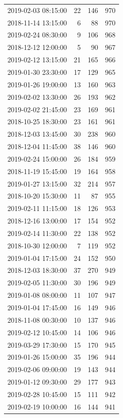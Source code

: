 \begin{tabular}{lrrr}
2019-02-03 08:15:00 & 22 & 146 & 970 \\
2018-11-14 13:15:00 & 6 & 88 & 970 \\
2019-02-24 08:30:00 & 9 & 106 & 968 \\
2018-12-12 12:00:00 & 5 & 90 & 967 \\
2019-02-12 13:15:00 & 21 & 165 & 966 \\
2019-01-30 23:30:00 & 17 & 129 & 965 \\
2019-01-26 19:00:00 & 13 & 160 & 963 \\
2019-02-02 13:30:00 & 26 & 193 & 962 \\
2019-02-02 21:45:00 & 23 & 169 & 961 \\
2018-10-25 18:30:00 & 23 & 161 & 961 \\
2018-12-03 13:45:00 & 30 & 238 & 960 \\
2018-12-04 11:45:00 & 38 & 146 & 960 \\
2019-02-24 15:00:00 & 26 & 184 & 959 \\
2018-11-19 15:45:00 & 19 & 164 & 958 \\
2019-01-27 13:15:00 & 32 & 214 & 957 \\
2018-10-20 15:30:00 & 11 & 87 & 955 \\
2019-02-11 11:15:00 & 18 & 126 & 953 \\
2018-12-16 13:00:00 & 17 & 154 & 952 \\
2019-02-14 11:30:00 & 22 & 138 & 952 \\
2018-10-30 12:00:00 & 7 & 119 & 952 \\
2019-01-04 17:15:00 & 24 & 152 & 950 \\
2018-12-03 18:30:00 & 37 & 270 & 949 \\
2019-02-05 11:30:00 & 30 & 196 & 949 \\
2019-01-08 08:00:00 & 11 & 107 & 947 \\
2019-01-04 17:45:00 & 16 & 149 & 946 \\
2018-11-08 00:30:00 & 10 & 137 & 946 \\
2019-02-12 10:45:00 & 14 & 106 & 946 \\
2019-03-29 17:30:00 & 15 & 170 & 945 \\
2019-01-26 15:00:00 & 35 & 196 & 944 \\
2019-02-06 09:00:00 & 19 & 143 & 944 \\
2019-01-12 09:30:00 & 29 & 177 & 943 \\
2019-02-28 10:45:00 & 15 & 111 & 942 \\
2019-02-19 10:00:00 & 16 & 144 & 941 \\

\end{tabular}

